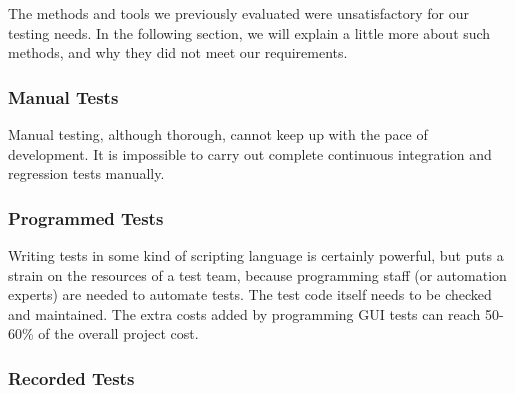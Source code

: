 
The methods and tools we previously evaluated were unsatisfactory 
for our testing needs. In the following section, we will explain a little more
about such methods, and why they did not meet our requirements.  

\subsubsection{Manual Tests}

Manual testing, although thorough, cannot keep up with the pace of development. It is impossible to carry out complete continuous integration and regression tests manually. 


\subsubsection{Programmed Tests}

Writing tests in some kind of scripting language is certainly powerful, but puts a strain on the resources of a test team, because programming staff (or automation experts) are needed to automate tests. The test code itself needs to be checked and maintained. The extra costs added by programming GUI tests can reach 50-60\% of the overall project cost. 


\subsubsection{Recorded Tests}

